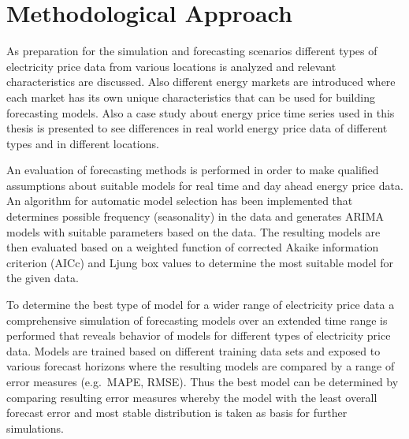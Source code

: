 
%

\section{Methodological Approach}

As preparation for the simulation and forecasting scenarios different types of electricity price data from various locations is analyzed and relevant characteristics are discussed. Also different energy markets are introduced where each market has its own unique characteristics that can be used for building forecasting models. Also a case study about energy price time series used in this thesis is presented to see differences in real world energy price data of different types and in different locations. 

An evaluation of forecasting methods is performed in order to make qualified assumptions about suitable models for real time and day ahead energy price data. An algorithm for automatic model selection has been implemented that determines possible frequency (seasonality) in the data and generates ARIMA models with suitable parameters based on the data. The resulting models are then evaluated based on a weighted function of corrected Akaike information criterion (AICc) and Ljung box values to determine the most suitable model for the given data. 

To determine the best type of model for a wider range of electricity price data a comprehensive simulation of forecasting models over an extended time range is performed that reveals behavior of models for different types of electricity price data. Models are trained based on different training data sets and exposed to various forecast horizons where the resulting models are compared by a range of error measures (e.g.~MAPE, RMSE). Thus the best model can be determined by comparing resulting error measures whereby the model with the least overall forecast error and most stable distribution is taken as basis for further simulations. 

